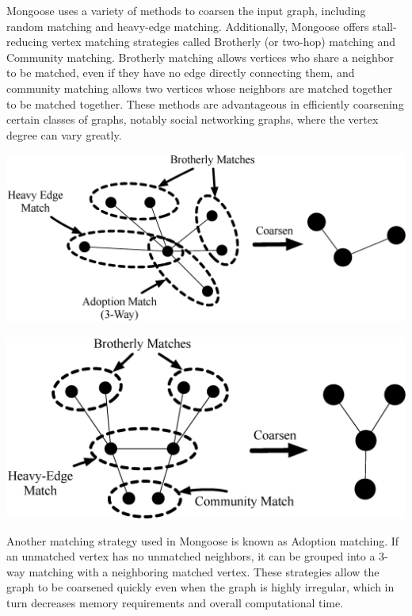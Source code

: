 \documentclass[letter]{article}
\begin{document}
Mongoose uses a variety of methods to coarsen the input graph, including random matching and heavy-edge matching. Additionally, Mongoose offers stall-reducing vertex matching strategies called Brotherly (or two-hop) matching and Community matching. Brotherly matching allows vertices who share a neighbor to be matched, even if they have no edge directly connecting them, and community matching allows two vertices whose neighbors are matched together to be matched together. These methods are advantageous in efficiently coarsening certain classes of graphs, notably social networking graphs, where the vertex degree can vary greatly.

\begin{center}
\begin{minipage}[c]{0.47\linewidth}
    \includegraphics[scale=0.26]{Figures/BrotherlyMatching.eps} 
\end{minipage}
\hspace{22pt}
\begin{minipage}[c]{0.47\linewidth}
    \includegraphics[scale=0.26]{Figures/CommunityMatching.eps} 
\end{minipage}
\end{center}

Another matching strategy used in Mongoose is known as Adoption matching. If an unmatched vertex has no unmatched neighbors, it can be grouped into a 3-way matching with a neighboring matched vertex. These strategies allow the graph to be coarsened quickly even when the graph is highly irregular, which in turn decreases memory requirements and overall computational time.
\end{document}
